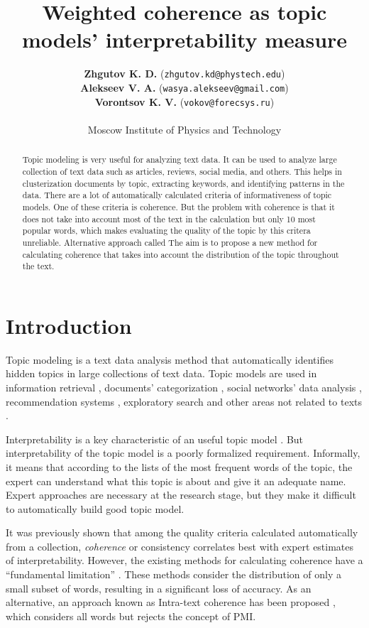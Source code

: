 \documentclass{article}
\title{Weighted coherence as topic models' interpretability measure}
\author{ 
\textbf{Zhgutov K. D.} (\texttt{zhgutov.kd@phystech.edu}) \\
\textbf{Alekseev V. A.} (\texttt{wasya.alekseev@gmail.com}) \\
\textbf{Vorontsov K. V.} (\texttt{vokov@forecsys.ru}) \\
\\
Moscow Institute of Physics and Technology
}
\date{}
\begin{document}
\maketitle

\begin{abstract}
Topic modeling is very useful for analyzing text data. 
It can be used to analyze large collection of text data such as articles, reviews, social media, and others. 
This helps in clusterization documents by topic, extracting keywords, and identifying patterns in the data. 
There are a lot of automatically calculated criteria of informativeness of topic models. 
One of these criteria is coherence. 
But the problem with coherence is that it does not take into account most of the text in the calculation but only 10 most popular words, which makes evaluating the quality of the topic by this critera unreliable. 
Alternative approach called 
The aim is to propose a new method for calculating coherence that takes into account the distribution of the topic throughout the text.
\end{abstract}



\section{Introduction}
Topic modeling is a text data analysis method that automatically identifies hidden topics in large collections of text data. 
Topic models are used in information retrieval \cite{vulic2013cross}, 
documents’ categorization \cite{zhou2009text}, 
social networks’ data analysis \cite{varshney2014modeling}, recommendation systems \cite{yeh2010recommendation}, 
exploratory search \cite{ianina2018multi}
and other areas not related to texts \cite{la2015probabilistic}.

Interpretability is a key characteristic of an useful topic model \cite{chang2009reading}. 
But interpretability of the topic model is a poorly formalized requirement. 
Informally, it means that according to the lists of the most frequent words of the topic, the expert can understand what this topic is about and give it an adequate name. 
Expert approaches are necessary at the research stage, but they make it difficult to automatically build good topic model.

It was previously shown \cite{newman-etal-2010-automatic} that among the quality criteria calculated automatically from a collection, \textit{coherence} or consistency   correlates best with expert estimates of interpretability.
However, the existing methods for calculating coherence have a ``fundamental limitation'' \cite{alekseev2018intra}. These methods consider the distribution of only a small subset of words, resulting in a significant loss of accuracy. As an alternative, an approach known as Intra-text coherence has been proposed \cite{alekseev2018intra}, which considers all words but rejects the concept of PMI.
\end{document}
